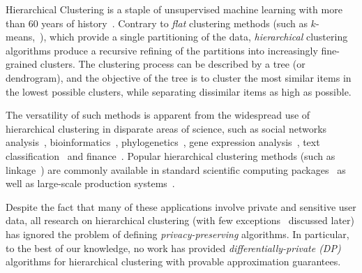Hierarchical Clustering is a staple of unsupervised machine learning with more than 60 years of history~\citep{ward1963hierarchical}.
Contrary to {\it flat} clustering methods (such as $k$-means,~\citet{J10}), which provide a single partitioning of the data, {\it hierarchical} clustering algorithms produce a recursive refining of the partitions into increasingly fine-grained clusters. 
The clustering process can be described by a tree (or dendrogram), and the objective of the tree is to cluster the most similar items in the lowest possible clusters, while separating dissimilar items as high as possible.

The versatility of such methods is apparent from the widespread use of hierarchical clustering in disparate areas of science, such as social networks analysis~\citep{leskovec2014mining,mann2008use}, bioinformatics~\citep{diez2015novel},  phylogenetics~\citep{sneath1962numerical,jardine1968model}, gene expression analysis~\citep{eisen1998cluster}, text classification~\citep{steinbach2000} and  finance~\citep{tumminello2010correlation}. Popular hierarchical clustering methods (such as linkage~\citep{J10}) are commonly available in standard scientific computing packages~\citep{virtanen2020scipy} as well as large-scale  production systems~\citep{bateni2017affinity, dhulipala2022hierarchical}.

Despite the fact that many of these applications involve private and sensitive user data, all research on hierarchical clustering (with few exceptions~\citep{Kolluri_CCS21, xiao2014differentially} discussed later) has ignored the problem of defining {\it  privacy-preserving} algorithms. In particular, to the best of our knowledge, no work has provided {\it differentially-private (DP)}~\citep{DP} algorithms for hierarchical clustering with provable approximation guarantees. 

